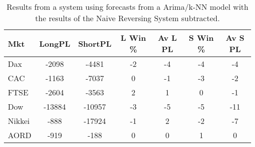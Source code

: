 \begin{table}[ht]
\centering
\caption[Mean PL from hybrid ARIMA/k-NN models minus mean PL from Naive Reverse system]{Results from a system using forecasts from a Arima/k-NN model with the results of the Naive Reversing System subtracted.} 
\label{tab:chp_ts:pred_close_arima_knn_sys1_diff}
\begin{tabular}{lcccccc}
  \toprule Mkt & LongPL & ShortPL & L Win \% & Av L PL & S Win \% & Av S PL \\ 
  \midrule Dax & -2098 & -4481 & -2 & -4 & -4 & -4 \\ 
  CAC & -1163 & -7037 & 0 & -1 & -3 & -2 \\ 
  FTSE & -2604 & -3563 & 2 & 1 & 0 & -1 \\ 
  Dow & -13884 & -10957 & -3 & -5 & -5 & -11 \\ 
  Nikkei & -888 & -17924 & -1 & 2 & -2 & -7 \\ 
  AORD & -919 & -188 & 0 & 0 & 1 & 0 \\ 
   \bottomrule \end{tabular}
\end{table}
